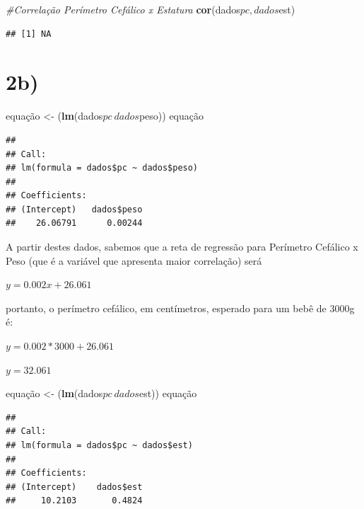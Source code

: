 \documentclass[11pt,]{article}
\newenvironment{Shaded}{\begin{snugshade}}{\end{snugshade}}
\newcommand{\KeywordTok}[1]{\textcolor[rgb]{0.13,0.29,0.53}{\textbf{{#1}}}}
\newcommand{\StringTok}[1]{\textcolor[rgb]{0.31,0.60,0.02}{{#1}}}
\newcommand{\CommentTok}[1]{\textcolor[rgb]{0.56,0.35,0.01}{\textit{{#1}}}}
\newcommand{\NormalTok}[1]{{#1}}
\begin{document}
\begin{Shaded}
\begin{Highlighting}[]
\CommentTok{#Correlação Perímetro Cefálico x Estatura}
\KeywordTok{cor}\NormalTok{(dados$pc,dados$est)}
\end{Highlighting}
\end{Shaded}

\begin{verbatim}
## [1] NA
\end{verbatim}

\section{2b)}\label{b-1}

\begin{Shaded}
\begin{Highlighting}[]
\NormalTok{equação <-}\StringTok{ }\NormalTok{(}\KeywordTok{lm}\NormalTok{(dados$pc~dados$peso))}
\NormalTok{equação}
\end{Highlighting}
\end{Shaded}

\begin{verbatim}
## 
## Call:
## lm(formula = dados$pc ~ dados$peso)
## 
## Coefficients:
## (Intercept)   dados$peso  
##    26.06791      0.00244
\end{verbatim}

A partir destes dados, sabemos que a reta de regressão para Perímetro
Cefálico x Peso (que é a variável que apresenta maior correlação) será

\(y = 0.002x + 26.061\)

portanto, o perímetro cefálico, em centímetros, esperado para um bebê de
3000g é:

\(y= 0.002*3000 + 26.061\)

\(y= 32.061\)

\begin{Shaded}
\begin{Highlighting}[]
\NormalTok{equação <-}\StringTok{ }\NormalTok{(}\KeywordTok{lm}\NormalTok{(dados$pc~dados$est))}
\NormalTok{equação}
\end{Highlighting}
\end{Shaded}

\begin{verbatim}
## 
## Call:
## lm(formula = dados$pc ~ dados$est)
## 
## Coefficients:
## (Intercept)    dados$est  
##     10.2103       0.4824
\end{verbatim}
\end{document}
